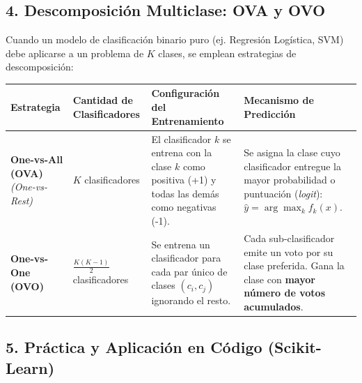\documentclass[11pt,oneside]{article}
\begin{document}
\subsection{4. Descomposición Multiclase: OVA y OVO}

Cuando un modelo de clasificación binario puro (ej. Regresión Logística, SVM) debe aplicarse a un problema de \(K\) clases, se emplean estrategias de descomposición:

\begin{center}
\begin{tabularx}{\textwidth}{>{\raggedright\arraybackslash}X >{\raggedright\arraybackslash}X >{\raggedright\arraybackslash}X >{\raggedright\arraybackslash}X}
\toprule
Estrategia & Cantidad de Clasificadores & Configuración del Entrenamiento & Mecanismo de Predicción \\
\midrule
\textbf{One-vs-All (OVA)} \emph{(One-vs-Rest)} & \(K\) clasificadores & El clasificador \(k\) se entrena con la clase \(k\) como positiva (+1) y todas las demás como negativas (-1). & Se asigna la clase cuyo clasificador entregue la mayor probabilidad o puntuación (\emph{logit}): \(\hat{y} = \arg\max_{k} f_k(x)\). \\
\textbf{One-vs-One (OVO)} & \(\frac{K(K-1)}{2}\) clasificadores & Se entrena un clasificador para cada par único de clases \((c_i, c_j)\) ignorando el resto. & Cada sub-clasificador emite un voto por su clase preferida. Gana la clase con \textbf{mayor número de votos acumulados}. \\
\bottomrule
\end{tabularx}
\end{center}

\subsection{5. Práctica y Aplicación en Código (Scikit-Learn)}
\end{document}
